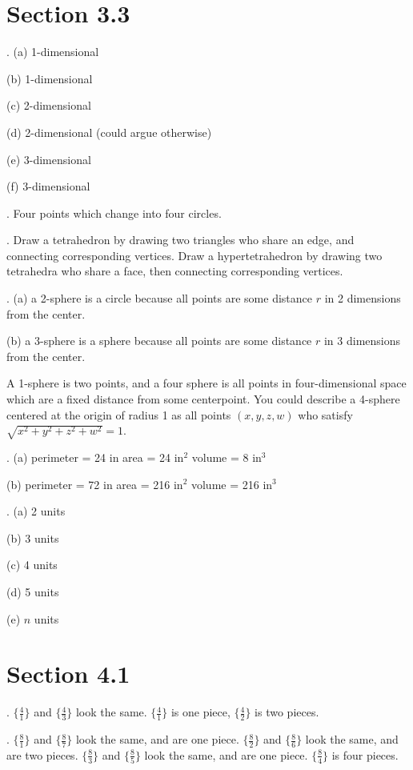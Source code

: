 \section*{Section 3.3}

. (a) 1-dimensional 

(b) 1-dimensional 

(c) 2-dimensional 

(d) 2-dimensional (could argue otherwise)

(e) 3-dimensional

(f) 3-dimensional

.  Four points which change into four circles.

.  Draw a tetrahedron by drawing two triangles who share an edge, and connecting corresponding vertices.  Draw a hypertetrahedron by drawing two tetrahedra who share a face, then connecting corresponding vertices.

.  (a) a 2-sphere is a circle because all points are some distance $r$ in 2 dimensions from the center. 

(b) a 3-sphere is a sphere because all points are some distance $r$ in 3 dimensions from the center.

A 1-sphere is two points, and a four sphere is all points in four-dimensional space which are a fixed distance from some centerpoint.  You could describe a 4-sphere centered at the origin of radius 1 as all points $(x, y, z, w)$ who satisfy $\sqrt{x^2 + y^2 + z^2 + w^2} = 1$.

.  (a) perimeter = 24 in \quad area = 24 in$^2$ \quad volume = 8 in$^3$

(b) perimeter = 72 in \quad area = 216 in$^2$ \quad volume = 216 in$^3$

.  (a) 2 units 

(b) 3 units 

(c) 4 units 

(d) 5 units 

(e) $n$ units

\section*{Section 4.1}

.  $\{ \frac41\}$ and $\{ \frac43\}$ look the same.  $\{\frac41\}$ is one piece, $\{\frac42\}$ is two pieces.

.  $\{ \frac81\}$ and $\{ \frac87\}$ look the same, and are one piece.  $\{ \frac82\}$ and $\{ \frac86\}$ look the same, and are two pieces.  $\{ \frac83\}$ and $\{ \frac85\}$ look the same, and are one piece.  $\{ \frac84\}$ is four pieces.

